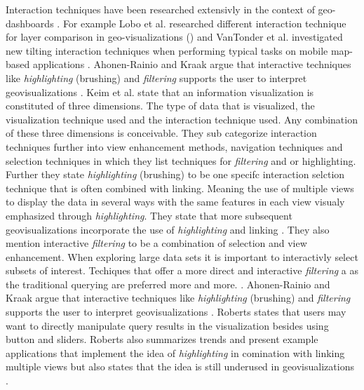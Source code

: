 Interaction techniques have been researched extensivly in the context of geo-dashboards \citep*{Keim.2005,Lobo.2015,vanTonder.2011}.
For example Lobo et al. researched different interaction technique for layer comparison in geo-visualizations (\citep*{Lobo.2015}) and
VanTonder et al. investigated new tilting interaction techniques when performing typical tasks on mobile map-based applications \citep*{vanTonder.2011}.
Ahonen-Rainio and Kraak argue that interactive techniques like \textit{highlighting} (brushing) and \textit{filtering} supports the user
to interpret geovisualizations \citep*{AhonenRainio.2005}.
Keim et al. state that an information visualization is constituted of three dimensions. The type of data that is visualized, the visualization technique used
and the interaction technique used. Any combination of these three dimensions is conceivable. They sub categorize interaction techniques further into
view enhancement methods, navigation techniques and selection techniques in which they list techniques for \textit{filtering} and or highlighting. Further they state
\textit{highlighting} (brushing) to be one specifc interaction selction technique that is often combined with linking. Meaning the use of multiple views to display the
data in several ways with the same features in each view visualy emphasized through \textit{highlighting}. They state that more subsequent geovisualizations incorporate the
use of \textit{highlighting} and linking \citep*{Keim.2005}. They also mention interactive \textit{filtering} to be a combination of selection and view enhancement. When exploring large
data sets it is important to interactivly select subsets of interest. Techiques that offer a more direct and interactive \textit{filtering} a as the traditional querying are
preferred more and more. \citep*{Keim.2005}. Ahonen-Rainio and Kraak argue that interactive techniques like \textit{highlighting} (brushing) and \textit{filtering} supports the user
to interpret geovisualizations \citep*{AhonenRainio.2005}. Roberts states that users may want to directly manipulate query results in the visualization besides using button
and sliders. Roberts also summarizes trends and present example applications that implement the idea of \textit{highlighting}
in comination with linking multiple views but also states that the idea is still underused in geovisualizations \citep*{Roberts.2005}.

